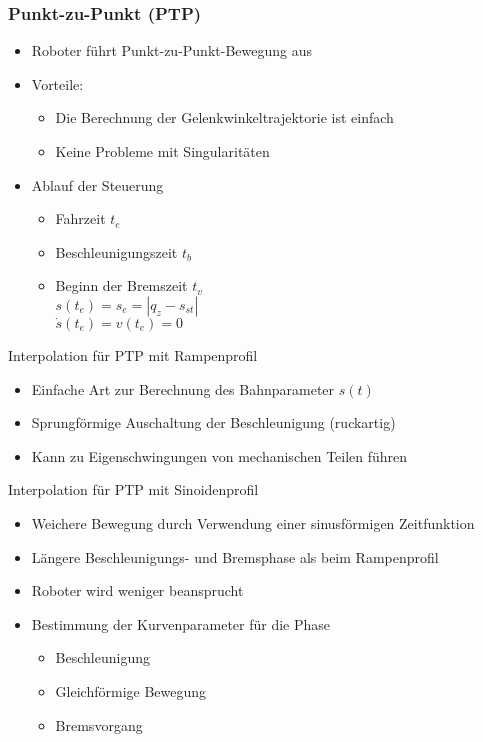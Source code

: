 \documentclass[paper=a4, fontsize=11pt]{scrartcl} %
\numberwithin{equation}{section} %
\numberwithin{figure}{section} %
\numberwithin{table}{section} %
\begin{document}
\subsubsection{Punkt-zu-Punkt (PTP)}

\begin{itemize}
\item Roboter führt Punkt-zu-Punkt-Bewegung aus
\item Vorteile:
\begin{itemize}
\item Die Berechnung der Gelenkwinkeltrajektorie ist einfach
\item Keine Probleme mit Singularitäten
\end{itemize}
\item Ablauf der Steuerung
\begin{itemize}
\item Fahrzeit $t_e$
\item Beschleunigungszeit $t_b$
\item Beginn der Bremszeit $t_v$\\
$s(t_e) = s_e = |q_z - s_{st}|$\\ 
$\dot s(t_e) = v(t_e) = 0$
\end{itemize}
\end{itemize}

Interpolation für PTP mit Rampenprofil
\begin{itemize}
\item Einfache Art zur Berechnung des Bahnparameter $s(t)$
\item Sprungförmige Auschaltung der Beschleunigung (ruckartig)
\item Kann zu Eigenschwingungen von mechanischen Teilen führen
\end{itemize}

Interpolation für PTP mit Sinoidenprofil
\begin{itemize}
\item Weichere Bewegung durch Verwendung einer sinusförmigen Zeitfunktion
\item Längere Beschleunigungs- und Bremsphase als beim Rampenprofil
\item Roboter wird weniger beansprucht
\item Bestimmung der Kurvenparameter für die Phase
\begin{itemize}
\item Beschleunigung
\item Gleichförmige Bewegung
\item Bremsvorgang
\end{itemize}
\end{itemize}
\end{document}

